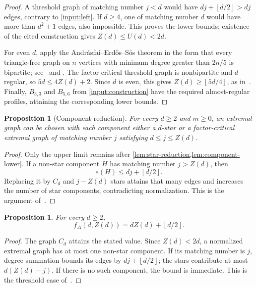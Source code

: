 \documentclass[11pt]{article}
\newtheorem{proposition}[theorem]{Proposition}
\theoremstyle{definition}
\theoremstyle{remark}
\newcommand{\fDelta}{f_{\Delta}}
\newcommand{\floor}[1]{\left\lfloor #1\right\rfloor}
\begin{document}
\begin{proof}
A threshold graph of matching number $j<d$ would have $dj+\floor{d/2}>dj$
edges, contrary to \cref{input:left}. If $d\ge4$, one of matching number
$d$ would have more than $d^2+1$ edges, also impossible. This proves the
lower bounds; existence of the cited construction gives $Z(d)\le U(d)<2d$.

For even $d$, apply the Andr\'asfai--Erd\H{o}s--S\'os theorem in the form
that every triangle-free graph on $n$ vertices with minimum degree greater
than $2n/5$ is bipartite; see~\cite{AES1974} and
\cite[Corollary~2.6]{AEY2022}.
The factor-critical threshold graph is nonbipartite and $d$-regular, so
$5d\le4Z(d)+2$. Since $d$ is even, this gives
$Z(d)\ge\floor{5d/4}$, as in~\cite[Lemma~4.7]{AEY2022}.
Finally, $B_{3,3}$ and $B_{5,6}$ from \cref{input:construction} have the
required almost-regular profiles, attaining the corresponding lower bounds.
\end{proof}

\begin{proposition}[Component reduction]\label{input:structure}
For every $d\ge2$ and $m\ge0$, an extremal graph can be chosen with each
component either a $d$-star or a factor-critical extremal graph of matching
number $j$ satisfying $d\le j\le Z(d)$.
\end{proposition}

\begin{proof}
Only the upper limit remains after \cref{lem:star-reduction,lem:component-lower}.
If a non-star component $H$ has matching number $j>Z(d)$, then
\[
  e(H)\le dj+\floor{d/2}.
\]
Replacing it by $C_d$ and $j-Z(d)$ stars attains that many edges and increases
the number of star components, contradicting normalization. This is the
argument of~\cite[Lemma~4.5]{AEY2022}.
\end{proof}

\begin{proposition}\label{input:threshold}
For every $d\ge2$,
\[
  \fDelta(d,Z(d))=dZ(d)+\floor{d/2}.
\]
\end{proposition}

\begin{proof}
The graph $C_d$ attains the stated value. Since $Z(d)<2d$, a normalized
extremal graph has at most one non-star component. If its matching number
is $j$, degree summation bounds its edges by $dj+\floor{d/2}$; the stars
contribute at most $d(Z(d)-j)$. If there is no such component, the bound is
immediate. This is the threshold case of~\cite[Theorem~4.8]{AEY2022}.
\end{proof}
\end{document}
